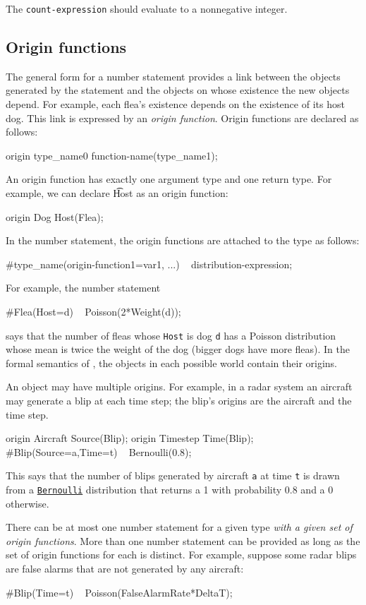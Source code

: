 \documentclass[12pt]{article}
\begin{document}
The {\tt count-expression} should evaluate to a nonnegative integer.

\subsection{Origin functions}\label{origin-section}
The general form for a number statement provides a link between the objects generated by the statement
and the objects on whose existence the new objects depend. For example, each flea's existence
depends on the existence of its host dog. This link is expressed by an {\em origin function}.
Origin functions are declared as follows:
\begin{blogcode}
origin type_name0 function-name(type_name1);
\end{blogcode}
An origin function has exactly one argument type and one return type.  
For example, we can declare {\t Host} as an origin function:
\begin{blogcode}
origin Dog Host(Flea);
\end{blogcode}

In the number statement, the origin functions are attached to the type 
as follows:
\begin{blogcode}
#type_name(origin-function1=var1, ...) ~ distribution-expression;
\end{blogcode}
For example, the number statement
\begin{blogcode}
#Flea(Host=d) ~ Poisson(2*Weight(d));
\end{blogcode}
says that the number of fleas whose {\tt Host} is dog {\tt d} has a Poisson distribution whose mean is twice the weight of the dog (bigger dogs have more fleas).
In the formal semantics of \bl, the objects in each possible world contain their origins.

An object may have multiple origins. For example, in a radar system an aircraft may generate a blip at each time step; the blip's origins are the aircraft and the time step.
\begin{blogcode}
origin Aircraft Source(Blip);
origin Timestep Time(Blip);
#Blip(Source=a,Time=t) ~ Bernoulli(0.8);
\end{blogcode}
This says that the number of blips generated by aircraft {\tt a} at time {\tt t} is drawn from
a \hyperref[builtin-distribution-appendix]{{\tt Bernoulli}} distribution that returns a 1 with probability 0.8 and a 0 otherwise.

There can be at most one number statement for a given type {\em with a given set of origin functions}. More than one number statement
can be provided as long as the set of origin functions for each is distinct. For example, suppose some radar blips are false alarms
that are not generated by any aircraft:
\begin{blogcode}
#Blip(Time=t) ~ Poisson(FalseAlarmRate*DeltaT);
\end{blogcode}
\end{document}
